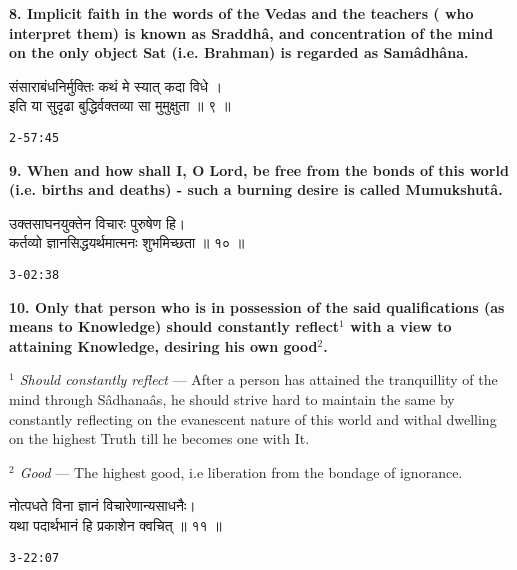 \documentclass{article}
\begin{document}
\textbf{8. Implicit faith in the words of the Vedas and the teachers (
who interpret them) is known as Sraddhâ, and concentration of the mind on the
only object Sat (i.e. Brahman) is regarded as Samâdhâna.
}

\begin{large}
\begin{center}
    \begin{hindi}
	संसाराबंधनिर्मुक्तिः कथं मे स्यात् कदा विधे ।\\
	इति या सु्दृढा बुद्धिर्वक्तव्या सा मुमुक्षुता ॥ ९ ॥
    \end{hindi}
\end{center}
\end{large}
\texttt{2-57:45}

\textbf{9. When and how shall I, O Lord, be free from the bonds of this world
(i.e. births and deaths) - such a burning desire is called Mumukshutâ.
}

\bigskip

\begin{large}
\begin{center}
    \begin{hindi}
	उक्तसाघनयुक्तेन विचारः पुरुषेण हि।\\
	कर्तव्यो ज्ञानसिद्धयर्थमात्मनः शुभमिच्छता ॥ १० ॥
    \end{hindi}
\end{center}
\end{large}
\texttt{3-02:38}

\textbf{ 10. Only that person who is in possession of the said qualifications
(as means to Knowledge) should constantly reflect$^1$ with a view to attaining
Knowledge, desiring his own good$^2$.
}

{\small\textit{$^1$ Should constantly reflect} --- After a person has
attained the tranquillity of the mind through Sâdhanaâs, he should strive hard
to maintain the same by constantly reflecting on the evanescent nature of this
world and withal dwelling on the highest Truth till he becomes one with It.}

{\small\textit{$^2$ Good} --- The highest good, i.e liberation from the bondage
of ignorance.}

\bigskip

\begin{large}
\begin{center}
    \begin{hindi}

	नोत्पधते विना ज्ञानं  विचारेणान्यसाधनैः।\\
    यथा पदार्थभानं हि प्रकाशेन क्वचित् ॥ ११  ॥

    \end{hindi}
\end{center}
\end{large}
\texttt{3-22:07}
\end{document}
